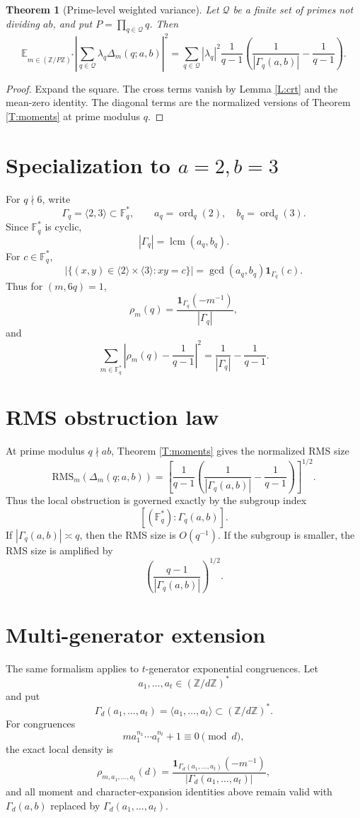 \documentclass[11pt]{article}
\newtheorem{theorem}{Theorem}
\newcommand{\Z}{\mathbb Z}
\newcommand{\F}{\mathbb F}
\newcommand{\E}{\mathbb E}
\newcommand{\1}{\mathbf 1}
\newcommand{\ord}{\operatorname{ord}}
\newcommand{\lcm}{\operatorname{lcm}}
\begin{document}
\begin{theorem}[Prime-level weighted variance]\label{T:weighted}
Let \(\mathcal Q\) be a finite set of primes not dividing \(ab\), and put \(P=\prod_{q\in\mathcal Q}q\).  Then
\[
\E_{m\in(\Z/P\Z)^*}
\left|
\sum_{q\in\mathcal Q}\lambda_q\Delta_m(q;a,b)
\right|^2
=
\sum_{q\in\mathcal Q}
|\lambda_q|^2
\frac1{q-1}
\left(
\frac1{|\Gamma_q(a,b)|}-\frac1{q-1}
\right).
\]
\end{theorem}

\begin{proof}
Expand the square.  The cross terms vanish by Lemma \ref{L:crt} and the mean-zero identity.  The diagonal terms are the normalized versions of Theorem \ref{T:moments} at prime modulus \(q\).
\end{proof}

\section{Specialization to \(a=2,b=3\)}

For \(q\nmid6\), write
\[
\Gamma_q=\langle2,3\rangle\subset\F_q^*,
\qquad
a_q=\ord_q(2),\quad b_q=\ord_q(3).
\]
Since \(\F_q^*\) is cyclic,
\[
|\Gamma_q|=\lcm(a_q,b_q).
\]
For \(c\in\F_q^*\),
\[
|\{(x,y)\in\langle2\rangle\times\langle3\rangle:xy=c\}|
=
\gcd(a_q,b_q)\1_{\Gamma_q}(c).
\]
Thus for \((m,6q)=1\),
\[
\rho_m(q)=\frac{\1_{\Gamma_q}(-m^{-1})}{|\Gamma_q|},
\]
and
\[
\sum_{m\in\F_q^*}\left|
\rho_m(q)-\frac1{q-1}
\right|^2
=
\frac1{|\Gamma_q|}-\frac1{q-1}.
\]


\section{RMS obstruction law}

At prime modulus \(q\nmid ab\), Theorem \ref{T:moments} gives the normalized RMS size
\[
\mathrm{RMS}_m(\Delta_m(q;a,b))
=
\left[
\frac1{q-1}\left(
\frac1{|\Gamma_q(a,b)|}-\frac1{q-1}
\right)
\right]^{1/2}.
\]
Thus the local obstruction is governed exactly by the subgroup index
\[
[(\F_q^*):\Gamma_q(a,b)].
\]
If \(|\Gamma_q(a,b)|\asymp q\), then the RMS size is \(O(q^{-1})\). If the subgroup is smaller, the RMS size is amplified by
\[
\left(\frac{q-1}{|\Gamma_q(a,b)|}\right)^{1/2}.
\]

\section{Multi-generator extension}

The same formalism applies to \(t\)-generator exponential congruences. Let
\[
a_1,\dots,a_t\in(\Z/d\Z)^*
\]
and put
\[
\Gamma_d(a_1,\dots,a_t)=\langle a_1,\dots,a_t\rangle\subset(\Z/d\Z)^*.
\]
For congruences
\[
m a_1^{n_1}\cdots a_t^{n_t}+1\equiv0\pmod d,
\]
the exact local density is
\[
\rho_{m,a_1,\dots,a_t}(d)
=
\frac{\1_{\Gamma_d(a_1,\dots,a_t)}(-m^{-1})}{|\Gamma_d(a_1,\dots,a_t)|},
\]
and all moment and character-expansion identities above remain valid with \(\Gamma_d(a,b)\) replaced by \(\Gamma_d(a_1,\dots,a_t)\).
\end{document}
